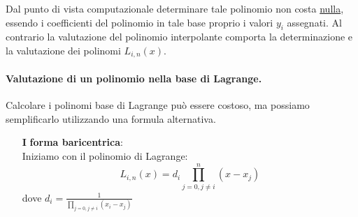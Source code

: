 \documentclass{article}
\begin{document}
Dal punto di vista computazionale determinare tale polinomio non costa
\underline{nulla}, essendo i coefficienti del polinomio in tale base proprio i
valori $y_i$ assegnati. Al contrario la valutazione del polinomio interpolante
comporta la determinazione e la valutazione dei polinomi $L_{i,n}(x)$.
\paragraph{Valutazione di un polinomio nella base di Lagrange.}
Calcolare i polinomi base di Lagrange può essere costoso, ma possiamo
semplificarlo utilizzando una formula alternativa.
\begin{itemize}
    \item [\textbf{I}] \textbf{forma baricentrica}:\\
        Iniziamo con il polinomio di Lagrange:
        $$L_{i,n}(x)=d_i\prod_{j=0,j\neq i}^n(x-x_j)$$
        dove $d_i=\frac{1}{\prod_{j=0,j\neq i}(x_i-x_j)}$


\end{itemize}
\end{document}

